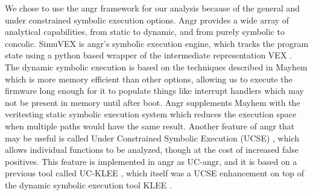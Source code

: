 \documentclass[letterpaper, 10 pt, conference]{ieeeconf}
\begin{document}
We chose to use the angr framework \cite{angr} for our analysis because of the general and under constrained symbolic execution options. Angr provides a wide array of analytical capabilities, from static to dynamic, and from purely symbolic to concolic. SimuVEX is angr's symbolic execution engine, which tracks the program state using a python based wrapper \cite{pyvex} of the intermediate representation VEX \cite{vex}. The dynamic symbolic execution is based on the techniques described in Mayhem \cite{mayhem} which is more memory efficient than other options, allowing us to execute the firmware long enough for it to populate things like interrupt handlers which may not be present in memory until after boot. Angr supplements Mayhem with the veritesting static symbolic execution system \cite{veritesting} which reduces the execution space when multiple paths would have the same result. Another feature of angr that may be useful is called Under Constrained Symbolic Execution (UCSE) \cite{ucklee2}, which allows individual functions to be analyzed, though at the cost of increased false positives. This feature is implemented in angr as UC-angr, and it is based on a previous tool called UC-KLEE \cite{ucklee1}, which itself was a UCSE enhancement on top of the dynamic symbolic execution tool KLEE \cite{klee}.

{}

\end{document}
